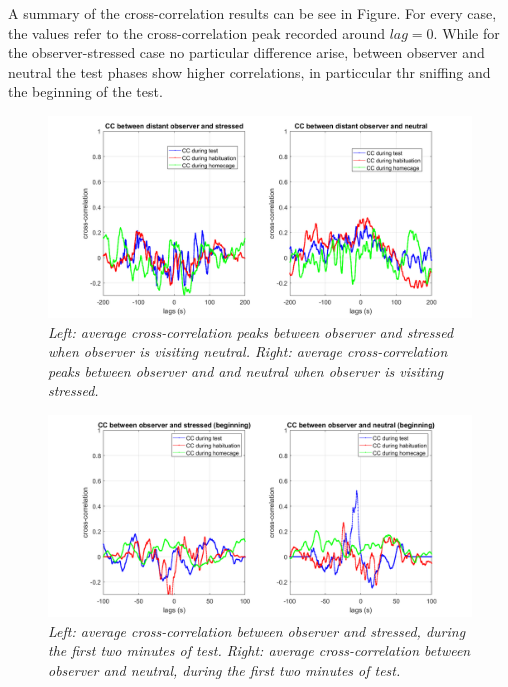 \documentclass[a4paper]{article}
\begin{document}
A summary of the cross-correlation results can be see in Figure. For every case, the values refer to the cross-correlation peak recorded around $lag=0$. While for the observer-stressed case no particular difference arise, between observer and neutral the test phases show higher correlations, in particcular thr sniffing and the beginning of the test.

\begin{figure}[H]
	
	\begin{center}
		\hspace*{-1.4cm}
		\includegraphics[scale=.4]{cc_distant.png} 
	\end{center} 
	\caption{\textit{Left: average cross-correlation peaks between observer and stressed when observer is visiting neutral. Right: average cross-correlation peaks between observer and and neutral when observer is visiting stressed.}}
	
\end{figure}

\begin{figure}[H]
	
	\begin{center}
		\hspace*{-1.4cm}
		\includegraphics[scale=.4]{average_cc_initial.png} 
	\end{center} 
	\caption{\textit{Left: average cross-correlation between observer and stressed, during the first two minutes of test. Right: average cross-correlation between observer and neutral, during the first two minutes of test.}}
	
\end{figure}
\end{document}
